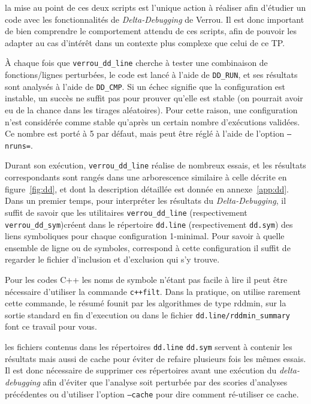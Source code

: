 \documentclass[a4paper]{article}
\newenvironment{warn}[1][Attention :]{
  \begin{mdframed}[style=warning]
    \noindent{\bf #1}
}{
  \end{mdframed}
}
\newenvironment{info}[1][NB :]{
  \begin{mdframed}[style=info]
    \noindent{\bf #1}
}{
  \end{mdframed}
}
\begin{document}
\begin{info}
  la mise au point de ces deux scripts est l'unique action à réaliser afin
  d'étudier un code avec les fonctionnalités de \textit{Delta-Debugging} de
  Verrou. Il est donc important de bien comprendre le comportement attendu de
  ces scripts, afin de pouvoir les adapter au cas d'intérêt dans un contexte
  plus complexe que celui de ce TP.
\end{info}

\bigskip

À chaque fois que \texttt{verrou\_dd\_line} cherche à tester une combinaison de
fonctions/lignes perturbées, le code est lancé à l'aide de \texttt{DD\_RUN}, et
ses résultats sont analysés à l'aide de \texttt{DD\_CMP}. Si un échec signifie
que la configuration est instable, un succès ne suffit pas pour prouver qu'elle
est stable (on pourrait avoir eu de la chance dans les tirages aléatoires). Pour
cette raison, une configuration n'est considérée comme stable qu'après un
certain nombre d'exécutions validées. Ce nombre est porté à 5 par défaut, mais
peut être réglé à l'aide de l'option \texttt{--nruns=}.

\bigskip

Durant son exécution, \texttt{verrou\_dd\_line} réalise de nombreux essais, et les
résultats correspondants sont rangés dans une arborescence similaire à celle
décrite en figure~\ref{fig:dd}, et dont la description détaillée est donnée en
annexe~\ref{app:dd}. Dans un premier temps, pour interpréter les résultats du
\textit{Delta-Debugging}, il suffit de savoir que les utilitaires
\texttt{verrou\_dd\_line} (respectivement \texttt{verrou\_dd\_sym})créent dans
le répertoire \texttt{dd.line} (respectivement \texttt{dd.sym}) des liens symboliques pour
chaque configuration 1-minimal. Pour savoir à quelle ensemble de ligne ou de
symboles, correspond à cette configuration il suffit de regarder le fichier d'inclusion et
d'exclusion qui s'y trouve.

Pour les codes C++ les noms de symbole n'étant pas facile à lire
il peut être nécessaire d'utiliser la commande \texttt{c++filt}. Dans la pratique,
on utilise rarement cette commande, 
le résumé founit par les algorithmes de type rddmin, sur la sortie standard
en fin d'execution ou dans le fichier \texttt{dd.line/rddmin\_summary} font ce travail pour vous.

\bigskip

\begin{warn}
  les fichiers contenus dans les répertoires \texttt{dd.line} \texttt{dd.sym}
  servent à contenir les résultats mais aussi de cache pour éviter de refaire plusieurs fois les mêmes essais. Il
  est donc nécessaire de supprimer ces répertoires avant une exécution du
  \textit{delta-debugging} afin d'éviter que l'analyse soit perturbée par des
  scories d'analyses précédentes ou d'utiliser l'option \texttt{--cache} pour dire comment ré-utiliser ce cache.
\end{warn}
\end{document}
